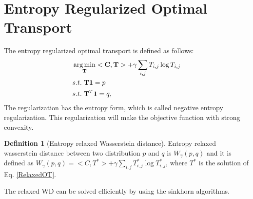 \documentclass{article}
\DeclareMathOperator*{\argmin}{arg\,min}
\theoremstyle{plain}
\theoremstyle{definition}
\newtheorem{defn}{Definition}[section]
\begin{document}
\section{Entropy Regularized Optimal Transport}
The entropy regularized optimal transport is defined as follows:
\begin{align}
	&\argmin_{\mathbf{T}}<\mathbf{C},\mathbf{T}> + \gamma \sum_{i,j}T_{i,j}\log T_{i,j} \nonumber\\
	&s.t.  \hspace{1mm} \mathbf{T}\mathbf{1} = p \nonumber\\
	&s.t.  \hspace{1mm} \mathbf{T}^{T}\mathbf{1} = q, \label{RelaxedOT}
\end{align}
The regularization has the entropy form, which is called negative entropy regularization. This regularization will make the objective function with strong convexity.

\begin{defn}[Entropy relaxed Wasserstein distance]
Entropy relaxed wasserstein distance between two distribution $p$ and $q$ is $W_{\gamma}(p,q)$ and it is defined as $W_{\gamma}(p,q) = <C, T^{*}> + \gamma \sum_{i,j}T^{*}_{i,j}\log T^{*}_{i,j}$, where $T^{*}$ is the solution of Eq. \ref{RelaxedOT}.
\label{defnRelaxWas}
\end{defn}
The relaxed WD can be solved efficiently by using the sinkhorn algorithms.
\end{document}

